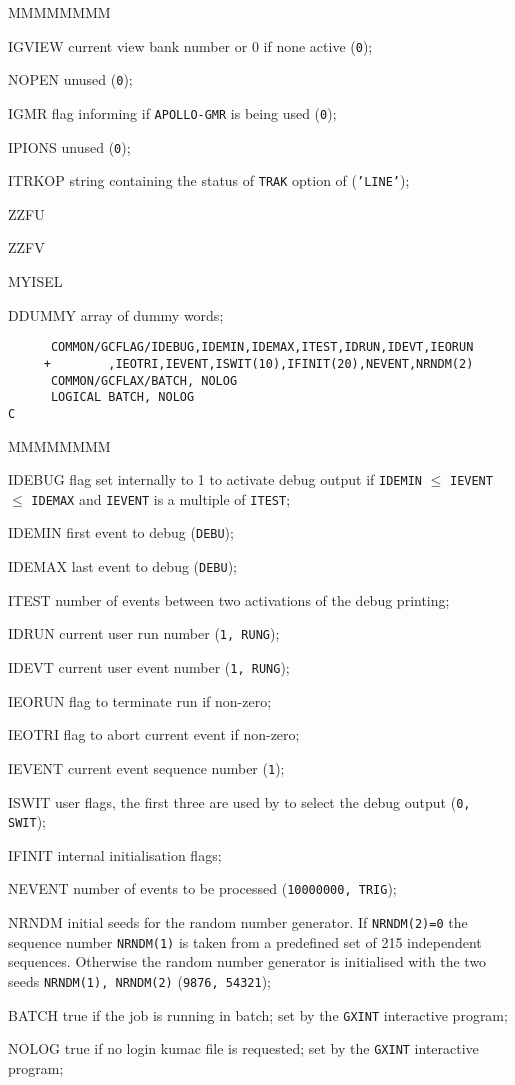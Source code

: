 \begin{DLtt}{MMMMMMMM}
\item[IGVIEW]current view bank number or 0 if none active ({\tt 0});
\item[NOPEN]unused ({\tt 0});
\item[IGMR]flag informing if {\tt APOLLO-GMR} is being used ({\tt 0});
\item[IPIONS]unused ({\tt 0});
\item[ITRKOP]string containing the status of {\tt TRAK} option of
 ({\tt 'LINE'});
\item[ZZFU]
\item[ZZFV]
\item[MYISEL]
\item[DDUMMY]array of dummy words;
\end{DLtt}
\begin{verbatim}
      COMMON/GCFLAG/IDEBUG,IDEMIN,IDEMAX,ITEST,IDRUN,IDEVT,IEORUN
     +        ,IEOTRI,IEVENT,ISWIT(10),IFINIT(20),NEVENT,NRNDM(2)
      COMMON/GCFLAX/BATCH, NOLOG
      LOGICAL BATCH, NOLOG
C
\end{verbatim}
\begin{DLtt}{MMMMMMMM}
\item[IDEBUG]flag set internally to 1 to activate debug
output if {\tt IDEMIN} $\leq$ {\tt IEVENT} $\leq$ {\tt IDEMAX}
and {\tt IEVENT} is a multiple of {\tt ITEST};
\item[IDEMIN]  first event to debug ({\tt DEBU});
\item[IDEMAX]  last event to debug ({\tt DEBU});
\item[ITEST] number of events between two activations
of the debug printing;
\item[IDRUN]current user run number   ({\tt 1, RUNG});
\item[IDEVT]current user event number  ({\tt 1, RUNG});
\item[IEORUN]flag to terminate run if non-zero;
\item[IEOTRI]flag to abort current event if non-zero;
\item[IEVENT]current event sequence number ({\tt 1});
\item[ISWIT]user flags, the first three are used by 
to select the debug output ({\tt 0, SWIT});
\item[IFINIT]internal initialisation flags;
\item[NEVENT]number of events to be processed  ({\tt 10000000, TRIG});
\item[NRNDM]initial seeds for the random number generator. If
{\tt NRNDM(2)=0} the sequence number {\tt NRNDM(1)} is taken from a
predefined set of 215 independent sequences. Otherwise the random
number generator is initialised with the two seeds {\tt NRNDM(1), NRNDM(2)}
({\tt 9876, 54321});
\item[BATCH] true if the job is running in batch; set by the {\tt GXINT}
interactive program;
\item[NOLOG] true if no login kumac file is requested; set by the
{\tt GXINT} interactive program;
\end{DLtt}
